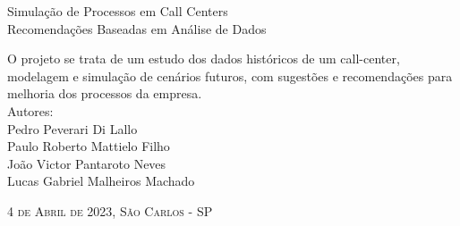 \color{black}
\begin{titlepage}
\vfill
\begin{center} 
{\Huge  Simulação de Processos em Call Centers} \\[0.5cm] 
{\LARGE Recomendações Baseadas em Análise de Dados} \\[1cm]
\hspace{.45\textwidth}
\begin{minipage}{.5\textwidth}

	{\Large O projeto se trata de um estudo dos dados históricos de um call-center, modelagem e simulação de cenários futuros, com sugestões e recomendações para melhoria dos processos da empresa.} \\[1cm] %
	
	{\normalsize Autores: \\[0.25cm]
            Pedro Peverari Di Lallo \\ 
			Paulo Roberto Mattielo Filho\\
			João Victor Pantaroto Neves\\
			Lucas Gabriel Malheiros Machado  } \\[1cm]
	\vspace{2.5pt} %
	

\end{minipage}
\vfill
\textsc{\LARGE 4 de Abril de 2023, São Carlos - SP} %
\end{center}
\end{titlepage}
\vfill 
